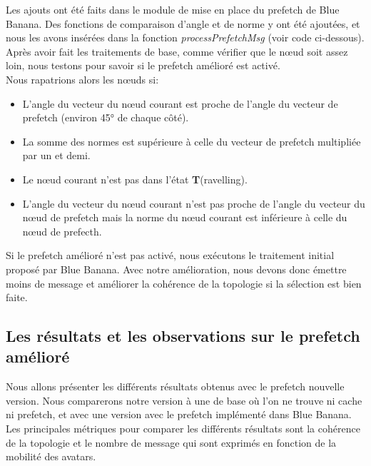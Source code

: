 \par Les ajouts ont été faits dans le module de mise en place du prefetch de Blue Banana. Des fonctions de comparaison d'angle et de norme y ont été ajoutées, et nous les avons insérées dans la fonction \textit{processPrefetchMsg} (voir code ci-dessous). Après avoir fait les traitements de base, comme vérifier que le nœud soit assez loin, nous testons pour savoir si le prefetch amélioré est activé. 
\newline
\\ Nous rapatrions alors les nœuds si:
        \begin{itemize}
        \renewcommand{\labelitemi}{$\bullet$}
                \item L'angle du vecteur du nœud courant est proche de l'angle du vecteur de prefetch (environ 45° de chaque côté).
		\item La somme des normes est supérieure à celle du vecteur de prefetch multipliée par un et demi. 
                \item Le nœud courant n'est pas dans l'état \textbf{T}(ravelling).
		\item L'angle du vecteur du nœud courant n'est pas proche de l'angle du vecteur du nœud de prefetch mais la norme du nœud courant est inférieure à celle du nœud de prefecth. 
        \end{itemize}
Si le prefetch amélioré n'est pas activé, nous exécutons le traitement initial proposé par Blue Banana. Avec notre amélioration, nous devons donc émettre moins de message et améliorer la cohérence de la topologie si la sélection est bien faite. 

\lstset{numbers=left,basicstyle=\scriptsize, numberstyle=\tiny, stepnumber=5, numbersep=5pt}




\subsection{Les résultats et les observations sur le prefetch amélioré}

Nous allons présenter les différents résultats obtenus avec le prefetch nouvelle version. Nous comparerons notre version à une de base où l'on ne trouve ni cache ni prefetch, et avec une version avec le prefetch implémenté dans Blue Banana. Les principales métriques pour comparer les différents résultats sont la cohérence de la topologie et le nombre de message qui sont exprimés en fonction de la mobilité des avatars.





